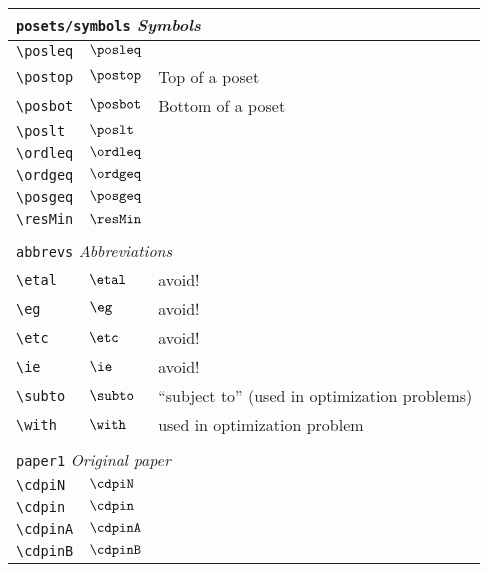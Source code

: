 \begin{longtable}{lll}
 \multicolumn{3}{l}{{\color[rgb]{0.5,0.5,0.5}\texttt{posets/symbols}} \emph{Symbols}}\\ 
 \hline
{\color[rgb]{0.5,0.5,0.5}\texttt{\textbackslash posleq}} & $\posleq$ & \\ 
 {\color[rgb]{0.5,0.5,0.5}\texttt{\textbackslash postop}} & $\postop$ &  Top of a poset\\ 
 {\color[rgb]{0.5,0.5,0.5}\texttt{\textbackslash posbot}} & $\posbot$ &  Bottom of a poset\\ 
 {\color[rgb]{0.5,0.5,0.5}\texttt{\textbackslash poslt}} & $\poslt$ & \\ 
 {\color[rgb]{0.5,0.5,0.5}\texttt{\textbackslash ordleq}} & $\ordleq$ & \\ 
 {\color[rgb]{0.5,0.5,0.5}\texttt{\textbackslash ordgeq}} & $\ordgeq$ & \\ 
 {\color[rgb]{0.5,0.5,0.5}\texttt{\textbackslash posgeq}} & $\posgeq$ & \\ 
 {\color[rgb]{0.5,0.5,0.5}\texttt{\textbackslash resMin}} & $\resMin$ & \\ 
  &  & \\ 
 \multicolumn{3}{l}{{\color[rgb]{0.5,0.5,0.5}\texttt{abbrevs}} \emph{Abbreviations}}\\ 
 \hline
\hline
{\color[rgb]{0.5,0.5,0.5}\texttt{\textbackslash etal}} & $\etal$ &  avoid!\\ 
 {\color[rgb]{0.5,0.5,0.5}\texttt{\textbackslash eg}} & $\eg$ &  avoid!\\ 
 {\color[rgb]{0.5,0.5,0.5}\texttt{\textbackslash etc}} & $\etc$ &  avoid!\\ 
 {\color[rgb]{0.5,0.5,0.5}\texttt{\textbackslash ie}} & $\ie$ &  avoid!\\ 
 {\color[rgb]{0.5,0.5,0.5}\texttt{\textbackslash subto}} & $\subto$ &  ``subject to'' (used in optimization problems)\\ 
 {\color[rgb]{0.5,0.5,0.5}\texttt{\textbackslash with}} & $\with$ &  used in optimization problem\\ 
  &  & \\ 
 \multicolumn{3}{l}{{\color[rgb]{0.5,0.5,0.5}\texttt{paper1}} \emph{Original paper}}\\ 
 \hline
\hline
{\color[rgb]{0.5,0.5,0.5}\texttt{\textbackslash cdpiN}} & $\cdpiN$ & \\ 
 {\color[rgb]{0.5,0.5,0.5}\texttt{\textbackslash cdpin}} & $\cdpin$ & \\ 
 {\color[rgb]{0.5,0.5,0.5}\texttt{\textbackslash cdpinA}} & $\cdpinA$ & \\ 
 {\color[rgb]{0.5,0.5,0.5}\texttt{\textbackslash cdpinB}} & $\cdpinB$ & \\ 

\end{longtable}
